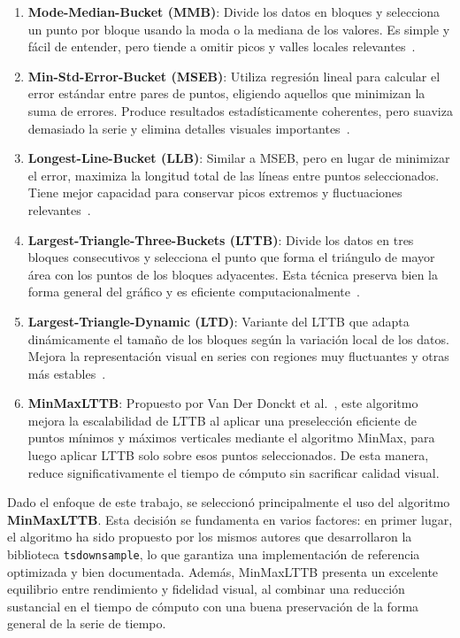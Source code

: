\begin{enumerate}
    \item \textbf{Mode-Median-Bucket (MMB)}: 
    Divide los datos en bloques y selecciona un punto por bloque usando la moda o la mediana de los valores. Es simple y fácil de entender, pero tiende a omitir picos y valles locales relevantes~\cite{steinarsson2013downsampling}.

    \item \textbf{Min-Std-Error-Bucket (MSEB)}: 
    Utiliza regresión lineal para calcular el error estándar entre pares de puntos, eligiendo aquellos que minimizan la suma de errores. Produce resultados estadísticamente coherentes, pero suaviza demasiado la serie y elimina detalles visuales importantes~\cite{steinarsson2013downsampling}.

    \item \textbf{Longest-Line-Bucket (LLB)}: 
    Similar a MSEB, pero en lugar de minimizar el error, maximiza la longitud total de las líneas entre puntos seleccionados. Tiene mejor capacidad para conservar picos extremos y fluctuaciones relevantes~\cite{steinarsson2013downsampling}.

    \item \textbf{Largest-Triangle-Three-Buckets (LTTB)}: 
    Divide los datos en tres bloques consecutivos y selecciona el punto que forma el triángulo de mayor área con los puntos de los bloques adyacentes. Esta técnica preserva bien la forma general del gráfico y es eficiente computacionalmente~\cite{steinarsson2013downsampling}.

    \item \textbf{Largest-Triangle-Dynamic (LTD)}: 
    Variante del LTTB que adapta dinámicamente el tamaño de los bloques según la variación local de los datos. Mejora la representación visual en series con regiones muy fluctuantes y otras más estables~\cite{steinarsson2013downsampling}.

    \item \textbf{MinMaxLTTB}: 
    Propuesto por Van Der Donckt et al.~\cite{vanderdonckt2023minmaxlttb}, este algoritmo mejora la escalabilidad de LTTB al aplicar una preselección eficiente de puntos mínimos y máximos verticales mediante el algoritmo MinMax, para luego aplicar LTTB solo sobre esos puntos seleccionados. De esta manera, reduce significativamente el tiempo de cómputo sin sacrificar calidad visual.
\end{enumerate}

Dado el enfoque de este trabajo, se seleccionó principalmente el uso del algoritmo \textbf{MinMaxLTTB}. Esta decisión se fundamenta en varios factores: en primer lugar, el algoritmo ha sido propuesto por los mismos autores que desarrollaron la biblioteca \texttt{tsdownsample}, lo que garantiza una implementación de referencia optimizada y bien documentada. Además, MinMaxLTTB presenta un excelente equilibrio entre rendimiento y fidelidad visual, al combinar una reducción sustancial en el tiempo de cómputo con una buena preservación de la forma general de la serie de tiempo.


